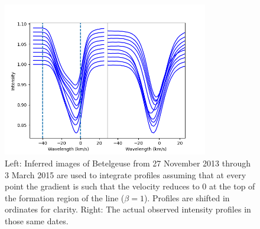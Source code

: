 \documentclass{/Users/art2/TeX/aanda/aa}
\def\kms {km\,s$^{-1}$}
\begin{document}
\begin{figure}
   \includegraphics[width=0.8\textwidth]{Fig1_Nadira1.png}
   \caption{Left: Inferred images of Betelgeuse from 27 November 2013 through 3 March 2015 are used to integrate profiles assuming that at every point 
   the gradient is such that the velocity reduces to 0 at the top of the formation region of the line ($\beta=1$). Profiles are shifted in ordinates 
   for clarity. Right: The actual observed intensity profiles in those same dates.}
   \label{betelbeta1}
   \end{figure}
\end{document}
